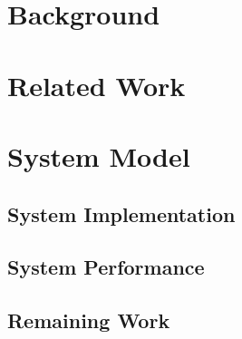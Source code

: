 \documentclass{sig-alternate}
\begin{document}
\section{Background}
\label{sec:background}


\section{Related Work}
\label{sec:related_work}


\section{System Model}
\label{sec:system_model}


\subsection{System Implementation}
\label{subsec:system_implementation}


\subsection{System Performance}
\label{subsec:system_performance}


\subsection{Remaining Work}
\label{subsec:remaining_work}


\end{document}
